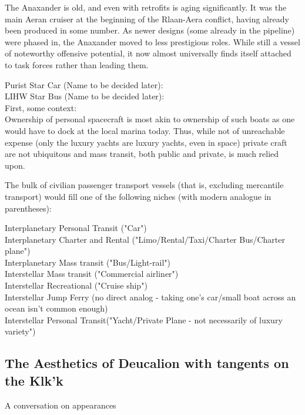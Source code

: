 The Anaxander is old, and even with retrofits is aging
significantly. It was the main Aeran cruiser at the beginning of the
Rlaan-Aera conflict, having already been produced in some number. As
newer designs (some already in the pipeline) were phased in, the
Anaxander moved to less prestigious roles. While still a vessel of
noteworthy offensive potential, it now almost universally finds itself
attached to task forces rather than leading them.



Purist Star Car (Name to be decided later):\\
LIHW Star Bus (Name to be decided later):\\

First, some context:\\

Ownership of personal spacecraft is most akin to ownership of such
boats as one would have to dock at the local marina today. Thus, while
not of unreachable expense (only the luxury yachts are luxury yachts,
even in space) private craft are not ubiquitous and mass transit, both
public and private, is much relied upon.

The bulk of civilian passenger transport vessels (that is, excluding
mercantile transport) would fill one of the following niches (with
modern analogue in parentheses):

Interplanetary Personal Transit ("Car")\\
Interplanetary Charter and Rental ("Limo/Rental/Taxi/Charter Bus/Charter plane")\\
Interplanetary Mass transit ("Bus/Light-rail")\\
Interstellar Mass transit ("Commercial airliner")\\
Interstellar Recreational ("Cruise ship")\\
Interstellar Jump Ferry (no direct analog - taking one's car/small boat across an ocean isn't common enough)\\
Interstellar Personal Transit("Yacht/Private Plane - not necessarily of luxury variety")\\


\subsection{The Aesthetics of Deucalion with tangents on the Klk'k}
A conversation on appearances

